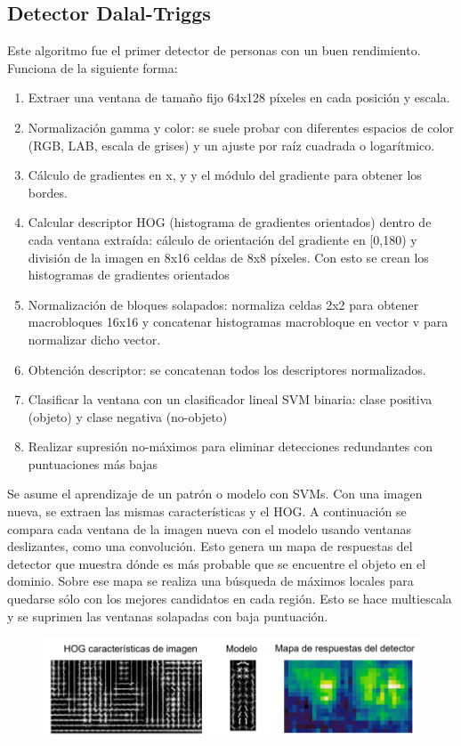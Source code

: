 \subsection{Detector Dalal-Triggs}
Este algoritmo fue el primer detector de personas con un buen rendimiento. Funciona de la siguiente forma:
\begin{enumerate}
\item Extraer una ventana de tamaño fijo 64x128 píxeles en cada posición y escala.
\item Normalización gamma y color: se suele probar con diferentes espacios de color (RGB, LAB, escala de grises) y un ajuste por raíz cuadrada o logarítmico.
\item Cálculo de gradientes en x, y y el módulo del gradiente para obtener los bordes.
\item Calcular descriptor HOG (histograma de gradientes orientados) dentro de cada ventana extraída: cálculo de orientación del gradiente en [0,180) y división de la imagen en 8x16 celdas de 8x8 píxeles. Con esto se crean los histogramas de gradientes orientados
\item Normalización de bloques solapados: normaliza celdas 2x2 para obtener macrobloques 16x16 y concatenar histogramas macrobloque en vector v para normalizar dicho vector.
\item Obtención descriptor: se concatenan todos los descriptores normalizados.
\item Clasificar la ventana con un clasificador lineal SVM binaria: clase positiva (objeto) y clase negativa (no-objeto)
\item Realizar supresión no-máximos para eliminar detecciones redundantes con puntuaciones más bajas
\end{enumerate}

Se asume el aprendizaje de un patrón o modelo con SVMs. Con una imagen nueva, se extraen las mismas características y el HOG. A continuación se compara cada ventana de la imagen nueva con el modelo usando ventanas deslizantes, como una convolución. Esto genera un mapa de respuestas del detector que muestra dónde es más probable que se encuentre el objeto en el dominio. Sobre ese mapa se realiza una búsqueda de máximos locales para quedarse sólo con los mejores candidatos en cada región. Esto se hace multiescala y se suprimen las ventanas solapadas con baja puntuación. 

\begin{figure}[h]
\centering
\includegraphics[width = \textwidth]{figs/deteccion-dalal.png}
\end{figure}


